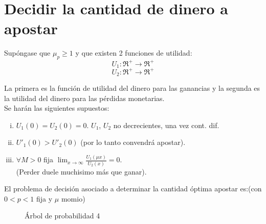  \section{Decidir la cantidad de dinero a apostar}
 \label{sec:cantidad-apostar}

 Supóngase que $\mu_p \ge 1$ y que existen 2 funciones de utilidad:
 \[U_1:\Re^+ \rightarrow \Re^+\]
 \[U_2:\Re^+ \rightarrow \Re^+\]

 La primera es la función de utilidad del dinero para las ganancias y la segunda es la utilidad del dinero para las pérdidas monetarias.\\

 Se harán las siguientes supuestos:

 \begin{enumerate}[(i)]
  \item $U_1(0)=U_2(0)=0$. $U_1$, $U_2$ no decrecientes, una vez cont. dif.
  \item $U'_1(0)>U'_2(0)$ (por lo tanto convendrá apostar).
  \item $\forall M>0$ fija $\displaystyle \lim_{x\rightarrow \infty} \frac{U_1(\mu x)}{U_2(x)}=0$.\\
  (Perder duele muchisimo más que ganar).
 \end{enumerate}
 El problema de decisión asociado a  determinar la cantidad óptima apostar es:(con $0<p<1$ fija y $\mu$ momio)\\

 \begin{figure}[ht]
  \begin{center}
 \end{center}
 \caption{Árbol de probabilidad 4}
 \end{figure}



